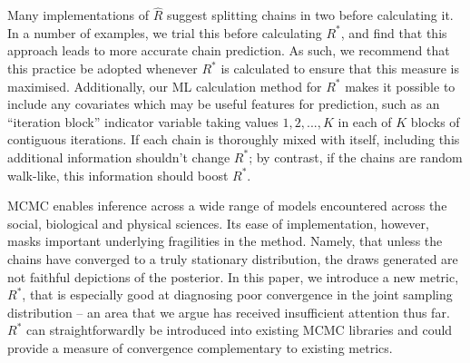 \documentclass{article}
\begin{document}
Many implementations of $\widehat{R}$ suggest splitting chains in two before calculating it. In a number of examples, we trial this before calculating $R^*$, and find that this approach leads to more accurate chain prediction. As such, we recommend that this practice be adopted whenever $R^*$ is calculated to ensure that this measure is maximised. Additionally, our ML calculation method for $R^*$ makes it possible to include any covariates which may be useful features for prediction, such as an ``iteration block'' indicator variable taking values $1, 2, ..., K$ in each of $K$ blocks of contiguous iterations. If each chain is thoroughly mixed with itself, including this additional information shouldn't change $R^*$; by contrast, if the chains are random walk-like, this information should boost $R^*$.

MCMC enables inference across a wide range of models encountered across the social, biological and physical sciences. Its ease of implementation, however, masks important underlying fragilities in the method. Namely, that unless the chains have converged to a truly stationary distribution, the draws generated are not faithful depictions of the posterior. In this paper, we introduce a new metric, $R^*$, that is especially good at diagnosing poor convergence in the joint sampling distribution -- an area that we argue has received insufficient attention thus far. $R^*$ can straightforwardly be introduced into existing MCMC libraries and could provide a measure of convergence complementary to existing metrics.

	

 
	
\end{document}
